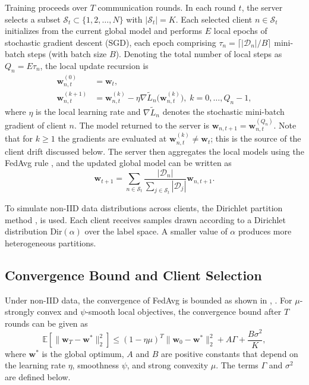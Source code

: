 \documentclass[journal]{IEEEtran}
\begin{document}
Training proceeds over $T$ communication rounds. In each round $t$, the server selects a subset $\mathcal{S}_t \subset \{1, 2, \ldots, N\}$ with $|\mathcal{S}_t| = K$. Each selected client $n \in \mathcal{S}_t$ initializes from the current global model and performs $E$ local epochs of stochastic gradient descent (SGD), each epoch comprising $\tau_n = \lceil |\mathcal{D}_n|/B \rceil$ mini-batch steps (with batch size $B$). Denoting the total number of local steps as $Q_n = E\tau_n$, the local update recursion is
\begin{equation}
\begin{split}
\bm{w}_{n,t}^{(0)} &= \bm{w}_t, \\
\bm{w}_{n,t}^{(k+1)} &= \bm{w}_{n,t}^{(k)} - \eta \nabla \tilde{L}_n\!\bigl(\bm{w}_{n,t}^{(k)}\bigr),\; k = 0, \ldots, Q_n\!-\!1,
\end{split}
\label{eq:local_update}
\end{equation}
where $\eta$ is the local learning rate and $\nabla \tilde{L}_n$ denotes the stochastic mini-batch gradient of client $n$. The model returned to the server is $\bm{w}_{n,t+1} = \bm{w}_{n,t}^{(Q_n)}$. Note that for $k \geq 1$ the gradients are evaluated at $\bm{w}_{n,t}^{(k)} \neq \bm{w}_t$; this is the source of the client drift discussed below. The server then aggregates the local models using the FedAvg rule \cite{mcmahan2017communication}, and the updated global model can be written as
\begin{equation}
\bm{w}_{t+1} = \sum_{n \in \mathcal{S}_t} \frac{|\mathcal{D}_n|}{\sum_{j \in \mathcal{S}_t} |\mathcal{D}_j|} \bm{w}_{n,t+1}.
\label{eq:fedavg}
\end{equation}

To simulate non-IID data distributions across clients, the Dirichlet partition method \cite{hsu2019measuring}, \cite{vahidian2024rethinking} is used. Each client receives samples drawn according to a Dirichlet distribution $\text{Dir}(\alpha)$ over the label space. A smaller value of $\alpha$ produces more heterogeneous partitions.

\subsection{Convergence Bound and Client Selection}

Under non-IID data, the convergence of FedAvg is bounded as shown in \cite{li2020federated}, \cite{karimireddy2020scaffold}. For $\mu$-strongly convex and $\psi$-smooth local objectives, the convergence bound after $T$ rounds can be given as
\begin{equation}
\mathbb{E}\left[\|\bm{w}_T - \bm{w}^*\|_2^2\right] \leq (1 - \eta\mu)^T \|\bm{w}_0 - \bm{w}^*\|_2^2 + A \Gamma + \frac{B \sigma^2}{K},
\label{eq:convergence_bound}
\end{equation}
where $\bm{w}^*$ is the global optimum, $A$ and $B$ are positive constants that depend on the learning rate $\eta$, smoothness $\psi$, and strong convexity $\mu$. The terms $\Gamma$ and $\sigma^2$ are defined below.
\end{document}
